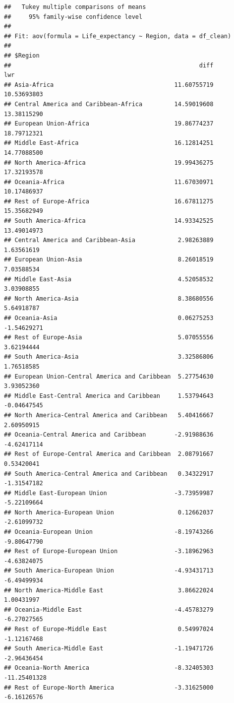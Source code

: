 \documentclass[
  10pt,
]{article}
\begin{document}
\begin{verbatim}
##   Tukey multiple comparisons of means
##     95% family-wise confidence level
## 
## Fit: aov(formula = Life_expectancy ~ Region, data = df_clean)
## 
## $Region
##                                                     diff          lwr
## Asia-Africa                                  11.60755719  10.53693803
## Central America and Caribbean-Africa         14.59019608  13.38115290
## European Union-Africa                        19.86774237  18.79712321
## Middle East-Africa                           16.12814251  14.77088500
## North America-Africa                         19.99436275  17.32193578
## Oceania-Africa                               11.67030971  10.17486937
## Rest of Europe-Africa                        16.67811275  15.35682949
## South America-Africa                         14.93342525  13.49014973
## Central America and Caribbean-Asia            2.98263889   1.63561619
## European Union-Asia                           8.26018519   7.03588534
## Middle East-Asia                              4.52058532   3.03908855
## North America-Asia                            8.38680556   5.64918787
## Oceania-Asia                                  0.06275253  -1.54629271
## Rest of Europe-Asia                           5.07055556   3.62194444
## South America-Asia                            3.32586806   1.76518585
## European Union-Central America and Caribbean  5.27754630   3.93052360
## Middle East-Central America and Caribbean     1.53794643  -0.04647545
## North America-Central America and Caribbean   5.40416667   2.60950915
## Oceania-Central America and Caribbean        -2.91988636  -4.62417114
## Rest of Europe-Central America and Caribbean  2.08791667   0.53420041
## South America-Central America and Caribbean   0.34322917  -1.31547182
## Middle East-European Union                   -3.73959987  -5.22109664
## North America-European Union                  0.12662037  -2.61099732
## Oceania-European Union                       -8.19743266  -9.80647790
## Rest of Europe-European Union                -3.18962963  -4.63824075
## South America-European Union                 -4.93431713  -6.49499934
## North America-Middle East                     3.86622024   1.00431997
## Oceania-Middle East                          -4.45783279  -6.27027565
## Rest of Europe-Middle East                    0.54997024  -1.12167468
## South America-Middle East                    -1.19471726  -2.96436454
## Oceania-North America                        -8.32405303 -11.25401328
## Rest of Europe-North America                 -3.31625000  -6.16126576

\end{verbatim}
\end{document}
